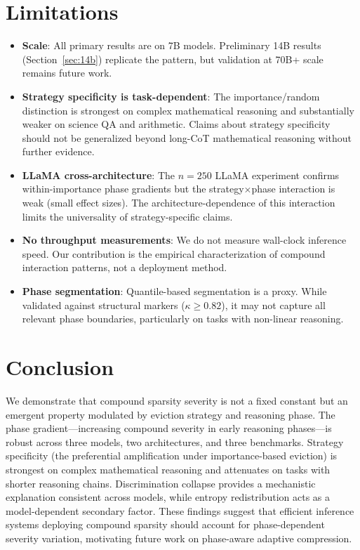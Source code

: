 \documentclass[11pt,a4paper]{article}
\begin{document}
\section{Limitations}

\begin{itemize}
    \item \textbf{Scale}: All primary results are on 7B models. Preliminary 14B results (Section~\ref{sec:14b}) replicate the pattern, but validation at 70B+ scale remains future work.
    \item \textbf{Strategy specificity is task-dependent}: The importance/random distinction is strongest on complex mathematical reasoning and substantially weaker on science QA and arithmetic. Claims about strategy specificity should not be generalized beyond long-CoT mathematical reasoning without further evidence.
    \item \textbf{LLaMA cross-architecture}: The $n=250$ LLaMA experiment confirms within-importance phase gradients but the strategy$\times$phase interaction is weak (small effect sizes). The architecture-dependence of this interaction limits the universality of strategy-specific claims.
    \item \textbf{No throughput measurements}: We do not measure wall-clock inference speed. Our contribution is the empirical characterization of compound interaction patterns, not a deployment method.
    \item \textbf{Phase segmentation}: Quantile-based segmentation is a proxy. While validated against structural markers ($\kappa \geq 0.82$), it may not capture all relevant phase boundaries, particularly on tasks with non-linear reasoning.
\end{itemize}

\section{Conclusion}

We demonstrate that compound sparsity severity is not a fixed constant but an emergent property modulated by eviction strategy and reasoning phase. The phase gradient---increasing compound severity in early reasoning phases---is robust across three models, two architectures, and three benchmarks. Strategy specificity (the preferential amplification under importance-based eviction) is strongest on complex mathematical reasoning and attenuates on tasks with shorter reasoning chains. Discrimination collapse provides a mechanistic explanation consistent across models, while entropy redistribution acts as a model-dependent secondary factor. These findings suggest that efficient inference systems deploying compound sparsity should account for phase-dependent severity variation, motivating future work on phase-aware adaptive compression.
\end{document}
